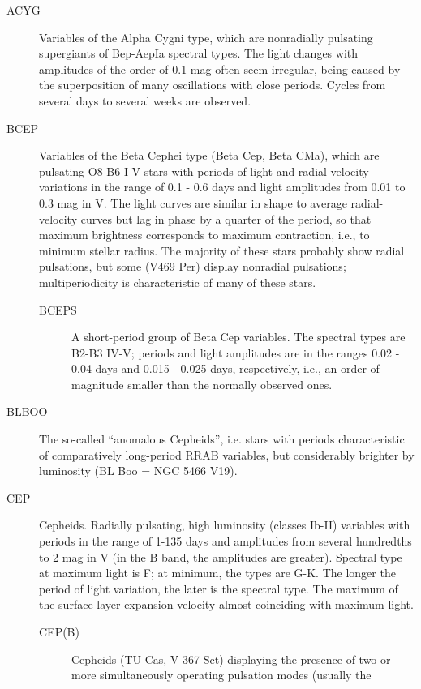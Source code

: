 \begin{description}
\item[ACYG]		Variables of the Alpha Cygni type, which are nonradially
				pulsating supergiants of Bep-AepIa spectral types. The light changes
				with amplitudes of the order of 0.1 mag often seem irregular, being
				caused by the superposition of many oscillations with close periods.
				Cycles from several days to several weeks are observed.
\item[BCEP]		Variables of the Beta Cephei type (Beta Cep, Beta CMa),
				which are pulsating O8-B6 I-V stars with periods of light and
				radial-velocity variations in the range of 0.1 - 0.6 days and light
				amplitudes from 0.01 to 0.3 mag in V. The light curves are similar in
				shape to average radial-velocity curves but lag in phase by a quarter of
				the period, so that maximum brightness corresponds to maximum
				contraction, i.e., to minimum stellar radius. The majority of these
				stars probably show radial pulsations, but some (V469 Per) display
				nonradial pulsations; multiperiodicity is characteristic of many of
				these stars.
	\begin{description}
\item[BCEPS]	A short-period group of Beta Cep variables. The
				spectral types are B2-B3 IV-V; periods and light amplitudes are in the
				ranges 0.02 - 0.04 days and 0.015 - 0.025 days, respectively, i.e., an
				order of magnitude smaller than the normally observed ones.
	\end{description}
\item[BLBOO]    The so-called ``anomalous Cepheids'', i.e. stars with
                periods characteristic of comparatively long-period RRAB variables, but
                considerably brighter by luminosity (BL Boo = NGC 5466 V19).
\item[CEP]		Cepheids. Radially pulsating, high luminosity (classes
				Ib-II) variables with periods in the range of 1-135 days and amplitudes
				from several hundredths to 2 mag in V (in the B band, the amplitudes are
				greater). Spectral type at maximum light is F; at minimum, the types are
				G-K. The longer the period of light variation, the later is the spectral
				type. The maximum of the surface-layer expansion velocity almost
				coinciding with maximum light.
	\begin{description}
\item[CEP(B)]	Cepheids (TU Cas, V 367 Sct) displaying the presence
				of two or more simultaneously operating pulsation modes (usually the

\end{description}
\end{description}
